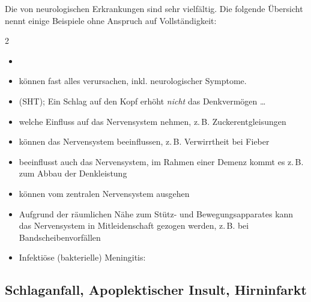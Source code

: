 \noindent Die  von neurologischen Erkrankungen
sind sehr vielfältig. Die folgende Übersicht nennt einige
Beispiele ohne Anspruch auf Vollständigkeit:

\begin{WidePar}
\begin{multicols}{2}
\begin{itemize}
  \item {}
  \item {} können fast alles verursachen, inkl.
  neurologischer
  Symptome.
  \item {} (SHT); Ein Schlag auf
  den Kopf erhöht \emph{nicht} das Denkvermögen \ldots
  \item {} welche Einfluss auf das
  Nervensystem nehmen, z.\,B. Zuckerentgleisungen
  \item {} können das Nervensystem beeinflussen,
  z.\,B. Verwirrtheit bei Fieber
  \item {} beeinflusst auch das Nervensystem, im Rahmen
  einer Demenz kommt es z.\,B. zum Abbau der Denkleistung
  \item {} können vom zentralen Nervensystem ausgehen
  \item {} Aufgrund der
  räumlichen Nähe zum Stütz- und Bewegungsapparates kann das
  Nervensystem in Mitleidenschaft gezogen werden, z.\,B. bei
  Bandscheibenvorfällen
\end{itemize}
\end{multicols}
\end{WidePar}


\begin{itemize}
  \item Infektiöse (bakterielle) Meningitis:
\end{itemize}


\subsection{Schlaganfall, Apoplektischer Insult, Hirninfarkt}
\label{topic:tia}
\label{topic:insult}
\label{topic:schlaganfall}



